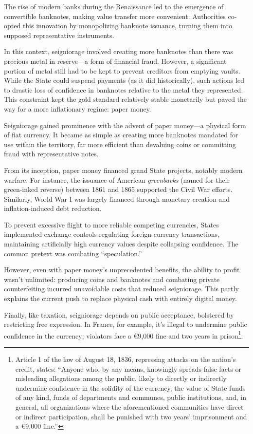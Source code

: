 \documentclass[
  a5paper,
  smalldemyvopaper,10pt,twoside,onecolumn,openright,extrafontsizes,hidelinks]{memoir}
\begin{document}
The rise of modern banks during the Renaissance led to the emergence of
convertible banknotes, making value transfer more convenient.
Authorities co-opted this innovation by monopolizing banknote issuance,
turning them into supposed representative instruments.

In this context, seigniorage involved creating more banknotes than there
was precious metal in reserve---a form of financial fraud. However, a
significant portion of metal still had to be kept to prevent creditors
from emptying vaults. While the State could suspend payments (as it did
historically), such actions led to drastic loss of confidence in
banknotes relative to the metal they represented. This constraint kept
the gold standard relatively stable monetarily but paved the way for a
more inflationary regime: paper money.

Seigniorage gained prominence with the advent of paper money---a
physical form of fiat currency. It became as simple as creating more
banknotes mandated for use within the territory, far more efficient than
devaluing coins or committing fraud with representative notes.

From its inception, paper money financed grand State projects, notably
modern warfare. For instance, the issuance of American \emph{greenbacks}
(named for their green-inked reverse) between 1861 and 1865 supported
the Civil War efforts. Similarly, World War I was largely financed
through monetary creation and inflation-induced debt reduction.

To prevent excessive flight to more reliable competing currencies,
States implemented exchange controls regulating foreign currency
transactions, maintaining artificially high currency values despite
collapsing confidence. The common pretext was combating ``speculation.''

However, even with paper money's unprecedented benefits, the ability to
profit wasn't unlimited: producing coins and banknotes and combating
private counterfeiting incurred unavoidable costs that reduced
seigniorage. This partly explains the current push to replace physical
cash with entirely digital money.

Finally, like taxation, seigniorage depends on public acceptance,
bolstered by restricting free expression. In France, for example, it's
illegal to undermine public confidence in the currency; violators face a
€9,000 fine and two years in prison\footnote{Article 1 of the law of
  August 18, 1836, repressing attacks on the nation's credit, states:
  ``Anyone who, by any means, knowingly spreads false facts or
  misleading allegations among the public, likely to directly or
  indirectly undermine confidence in the solidity of the currency, the
  value of State funds of any kind, funds of departments and communes,
  public institutions, and, in general, all organizations where the
  aforementioned communities have direct or indirect participation,
  shall be punished with two years' imprisonment and a €9,000 fine.''}.
\end{document}
